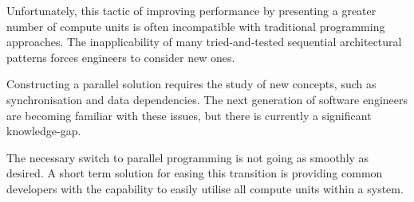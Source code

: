 Unfortunately, this tactic of improving performance by presenting a greater number of compute units is often incompatible with traditional programming approaches. The inapplicability of many tried-and-tested sequential architectural patterns forces engineers to consider new ones.

Constructing a parallel solution requires the study of new concepts, such as synchronisation and data dependencies. The next generation of software engineers are becoming familiar with these issues, but there is currently a significant knowledge-gap.

The necessary switch to parallel programming is not going as smoothly as desired. A short term solution for easing this transition is providing common developers with the capability to easily utilise all compute units within a system.
